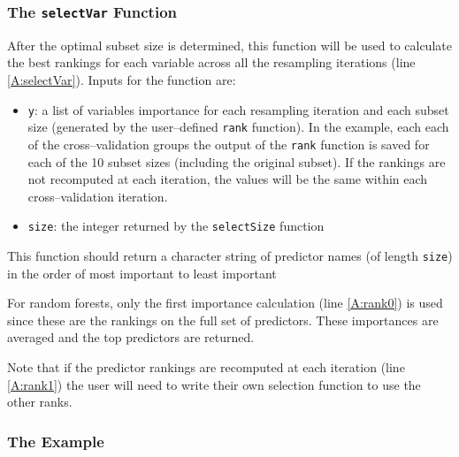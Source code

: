 \documentclass[12pt]{article}
\begin{document}
\subsubsection{The \texttt{selectVar} Function}

After the optimal subset size is determined, this function will be used to calculate the best rankings for each variable across all the resampling iterations (line \ref{A:selectVar}). Inputs for the function are:
\begin{itemize}
\item \texttt{y}: a list of variables importance for each resampling iteration and each subset size (generated by the user--defined \texttt{rank} function). In the example, each each of the cross--validation groups the output of the \texttt{rank} function is saved for each of the 10 subset sizes (including the original subset). If the rankings are not recomputed at each iteration, the values will be the same within each cross--validation iteration.
\item \texttt{size}: the integer returned by the  \texttt{selectSize} function
\end{itemize}
This function should return a character string of predictor names (of length \texttt{size}) in the order of most important to least important

For random forests, only the first importance calculation (line \ref{A:rank0}) is used since these are the rankings on the full set of predictors. These importances are averaged and the top predictors are returned.
\begin{Schunk}
\end{Schunk}
Note that if the predictor rankings are recomputed at each iteration (line \ref{A:rank1}) the user will need to write their own selection function to use the other ranks.

\subsubsection{The Example}
\end{document}
